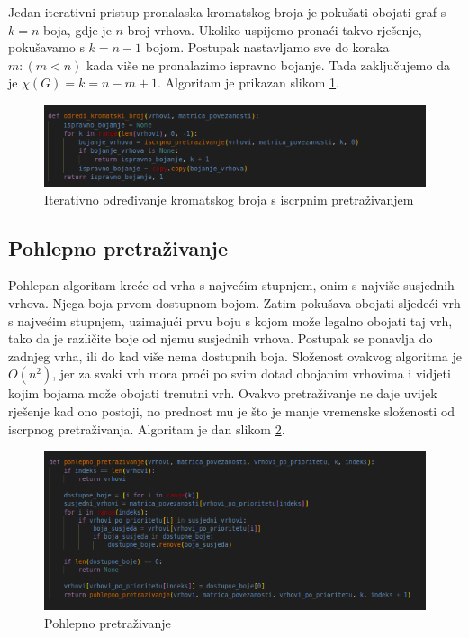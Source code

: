 \documentclass[times, utf8, zavrsni]{fer}
\begin{document}
Jedan iterativni pristup pronalaska kromatskog broja je pokušati obojati graf s $k=n$ boja, gdje je $n$ broj vrhova. Ukoliko uspijemo pronaći takvo rješenje, pokušavamo s $k=n-1$ bojom. Postupak nastavljamo sve do koraka $m: (m < n)$ kada više ne pronalazimo ispravno bojanje. Tada zaključujemo da je $\chi(G)=k=n-m+1$. Algoritam je prikazan slikom \ref{fig:algoritam iterativnog iscprnog odredivanja kromatskog broja}.

\begin{figure}[htb]
\centering
\includegraphics[width=12cm]{images/iterativni_algoritam_iscprnog_pretrazivanja.png}
\caption{Iterativno određivanje kromatskog broja s iscrpnim pretraživanjem}
\label{fig:algoritam iterativnog iscprnog odredivanja kromatskog broja}
\end{figure}

\subsection{Pohlepno pretraživanje}
Pohlepan algoritam kreće od vrha s najvećim stupnjem, onim s najviše susjednih vrhova. Njega boja prvom dostupnom bojom. Zatim pokušava obojati sljedeći vrh s najvećim stupnjem, uzimajući prvu boju s kojom može legalno obojati taj vrh, tako da je različite boje od njemu susjednih vrhova. Postupak se ponavlja do zadnjeg vrha, ili do kad više nema dostupnih boja. Složenost ovakvog algoritma je $O(n^2)$, jer za svaki vrh mora proći po svim dotad obojanim vrhovima i vidjeti kojim bojama može obojati trenutni vrh. Ovakvo pretraživanje ne daje uvijek rješenje kad ono postoji, no prednost mu je što je manje vremenske složenosti od iscrpnog pretraživanja. Algoritam je dan slikom \ref{fig:pohlepno pretrazivanje}.

\begin{figure}[htb]
\centering
\includegraphics[width=12cm]{images/pohlepni_algoritam.png}
\caption{Pohlepno pretraživanje}
\label{fig:pohlepno pretrazivanje}
\end{figure}
\end{document}

